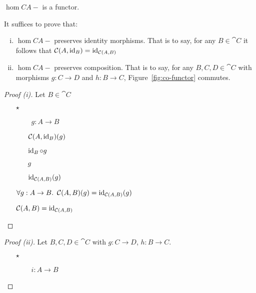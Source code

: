 \begin{prop}
  $\hom{C}{A}{-}$ is a functor.

  It suffices to prove that:
  \begin{enumerate}[(i)]
    \item $\hom{C}{A}{-}$ preserves identity morphisms. That is to say, for any $B\in\cat{C}$ it follows that $\mathcal{C}(A, \operatorname{id}_B) = \operatorname{id}_{\mathcal{C}(A, B)}$
    \item $\hom{C}{A}{-}$ preserves composition. That is to say, for any $B,C,D\in\cat{C}$ with morphisms $g : C \to D$
      and $h : B \to C$, Figure~\ref{fig:co-functor} commutes.
  \end{enumerate}
  \begin{proof}[Proof (i)]
    Let $B\in\cat{C}$
    \begin{itemize}
      \item[$\star$]
        \begin{itemize}
            \item[\phs] \Let~$g : A \to B$
              \marginnote{\Hyp}
            \item[\phs]
              $\mathcal{C}(A, \operatorname{id}_B)(g)$

            \item[\eqs]
              $\operatorname{id}_B\circ g$
              \marginnote{\Def-\ref{def:co-hom}}

            \item[\eqs]
              $g$
              \marginnote{\Def-$\id$}

            \item[\eqs]
              $\operatorname{id}_{\mathcal{C}(A, B)}(g)$
              \marginnote{\Def-$\id$}
        \end{itemize}

      \item[\imps]
        $\forall g : A \to B\ldotp~\mathcal{C}(A, B)(g) = \operatorname{id}_{\mathcal{C}(A, B)}(g)$
        \marginnote{$\forall$-\Intro-$\star$}

      \item[\iffs]
        $\mathcal{C}(A, B) = \operatorname{id}_{\mathcal{C}(A, B)}$
        \marginnote{\Def-=}
        \qedhere
    \end{itemize}
  \end{proof}

  \begin{proof}[Proof (ii)]
    Let $B, C, D\in\cat{C}$ with ${g : C\to D}$, ${h : B\to C}$.
    \begin{itemize}
      \item[$\star$]
        \begin{itemize}
          \item[\phs] \Let~$i : A\to B$
            \marginnote{\Hyp}


\end{itemize}
\end{itemize}
\end{proof}
\end{prop}

